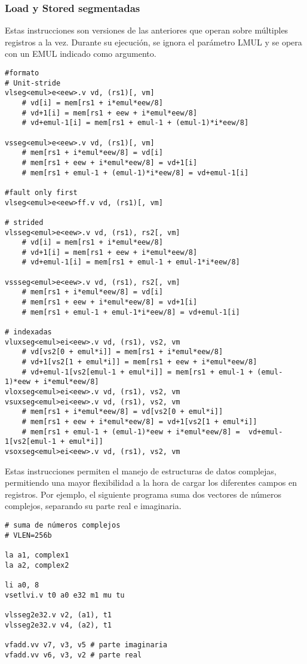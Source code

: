 \subsubsection{Load y Stored segmentadas}
Estas instrucciones son versiones de las anteriores que operan sobre múltiples
registros a la vez. Durante su ejecución, se ignora el parámetro LMUL y se opera con un EMUL indicado como
argumento.

\begin{lstlisting}
#formato
# Unit-stride
vlseg<emul>e<eew>.v vd, (rs1)[, vm] 
    # vd[i] = mem[rs1 + i*emul*eew/8] 
    # vd+1[i] = mem[rs1 + eew + i*emul*eew/8]
    # vd+emul-1[i] = mem[rs1 + emul-1 + (emul-1)*i*eew/8]

vsseg<emul>e<eew>.v vd, (rs1)[, vm]
    # mem[rs1 + i*emul*eew/8] = vd[i]
    # mem[rs1 + eew + i*emul*eew/8] = vd+1[i]
    # mem[rs1 + emul-1 + (emul-1)*i*eew/8] = vd+emul-1[i]

#fault only first
vlseg<emul>e<eew>ff.v vd, (rs1)[, vm]

# strided
vlsseg<emul>e<eew>.v vd, (rs1), rs2[, vm]
    # vd[i] = mem[rs1 + i*emul*eew/8] 
    # vd+1[i] = mem[rs1 + eew + i*emul*eew/8]
    # vd+emul-1[i] = mem[rs1 + emul-1 + emul-1*i*eew/8]

vssseg<emul>e<eew>.v vd, (rs1), rs2[, vm]
    # mem[rs1 + i*emul*eew/8] = vd[i]                   
    # mem[rs1 + eew + i*emul*eew/8] = vd+1[i]
    # mem[rs1 + emul-1 + emul-1*i*eew/8] = vd+emul-1[i]

# indexadas
vluxseg<emul>ei<eew>.v vd, (rs1), vs2, vm
    # vd[vs2[0 + emul*i]] = mem[rs1 + i*emul*eew/8]
    # vd+1[vs2[1 + emul*i]] = mem[rs1 + eew + i*emul*eew/8]
    # vd+emul-1[vs2[emul-1 + emul*i]] = mem[rs1 + emul-1 + (emul-1)*eew + i*emul*eew/8]
vloxseg<emul>ei<eew>.v vd, (rs1), vs2, vm
vsuxseg<emul>ei<eew>.v vd, (rs1), vs2, vm
    # mem[rs1 + i*emul*eew/8] = vd[vs2[0 + emul*i]]
    # mem[rs1 + eew + i*emul*eew/8] = vd+1[vs2[1 + emul*i]]
    # mem[rs1 + emul-1 + (emul-1)*eew + i*emul*eew/8] =  vd+emul-1[vs2[emul-1 + emul*i]]
vsoxseg<emul>ei<eew>.v vd, (rs1), vs2, vm

\end{lstlisting}

Estas instrucciones permiten el manejo de estructuras de datos complejas,
permitiendo una mayor flexibilidad a la hora de cargar los diferentes campos en registros. Por
ejemplo, el siguiente programa suma dos vectores de números complejos,
separando su parte real e imaginaria.

\begin{lstlisting}
# suma de números complejos
# VLEN=256b

la a1, complex1
la a2, complex2

li a0, 8 
vsetlvi.v t0 a0 e32 m1 mu tu

vlsseg2e32.v v2, (a1), t1
vlsseg2e32.v v4, (a2), t1

vfadd.vv v7, v3, v5 # parte imaginaria
vfadd.vv v6, v3, v2 # parte real
\end{lstlisting}


